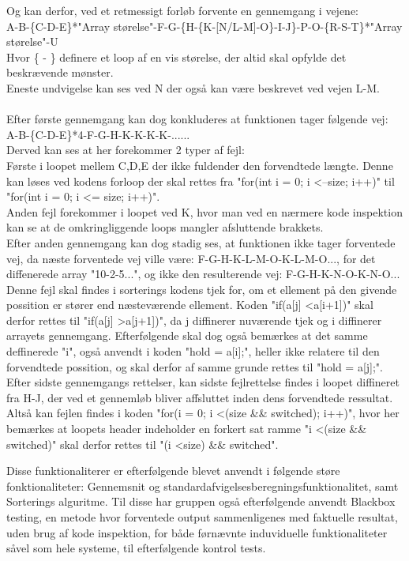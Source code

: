 \documentclass[11pt]{article}
\begin{document}
    Og kan derfor, ved et retmessigt forløb forvente en gennemgang i vejene:\\
    A-B-\{C-D-E\}*"Array størelse"-F-G-\{H-\{K-[N/L-M]-O\}-I-J\}-P-O-\{R-S-T\}*"Array størelse"-U\\
    Hvor \{ - \} definere et loop af en vis størelse, der altid skal opfylde det beskrævende mønster.\\
    Eneste undvigelse kan ses ved N der også kan være beskrevet ved vejen L-M.\\
    \\
    Efter første gennemgang kan dog konkluderes at funktionen tager følgende vej:\\
    A-B-\{C-D-E\}*4-F-G-H-K-K-K-K-......\\
    Derved kan ses at her forekommer 2 typer af fejl:\\
    Første i loopet mellem C,D,E der ikke fuldender den forvendtede længte. Denne kan løses ved kodens forloop der skal rettes fra "for(int i = 0; i \textless --size; i++)" til "for(int i = 0; i \textless= size; i++)".\\
    Anden fejl forekommer i loopet ved K, hvor man ved en nærmere kode inspektion kan se at de omkringliggende loops mangler afsluttende brakkets.\\
    Efter anden gennemgang kan dog stadig ses, at funktionen ikke tager forventede vej, da næste forventede vej ville være: F-G-H-K-L-M-O-K-L-M-O..., for det diffenerede array "10-2-5...", og ikke den resulterende vej: F-G-H-K-N-O-K-N-O...\\
    Denne fejl skal findes i sorterings kodens tjek for, om et ellement på den givende possition er stører end næsteværende ellement. Koden "if(a[j] \textless a[i+1])" skal derfor rettes til "if(a[j] \textgreater a[j+1])", da j diffinerer nuværende tjek og i diffinerer arrayets gennemgang. Efterfølgende skal dog også bemærkes at det samme deffinerede "i", også anvendt i koden "hold = a[i];", heller ikke relatere til den forvendtede possition, og skal derfor af samme grunde rettes til "hold = a[j];".\\
    Efter sidste gennemgangs rettelser, kan sidste fejlrettelse findes i loopet diffineret fra H-J, der ved et gennemløb bliver affsluttet inden dens forvendtede ressultat. Altså kan fejlen findes i koden "for(i = 0; i \textless (size \&\& switched); i++)", hvor her bemærkes at loopets header indeholder en forkert sat ramme "i \textless (size \&\& switched)" skal derfor rettes til "(i \textless size) \&\& switched".

    \noindent
    Disse funktionaliterer er efterfølgende blevet anvendt i følgende støre fonktionaliteter:
    Gennemsnit og standardafvigelsesberegningsfunktionalitet,
    samt Sorterings alguritme.
    Til disse har gruppen også efterfølgende anvendt Blackbox testing, en metode hvor forventede output sammenligenes med faktuelle resultat, uden brug af kode inspektion, for både førnævnte induviduelle funktionaliteter såvel som hele systeme, til efterfølgende kontrol tests.
    
\end{document}
